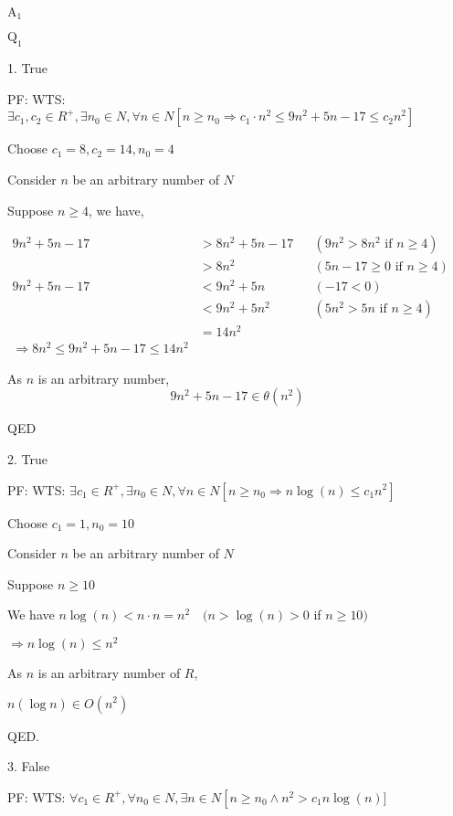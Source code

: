 \documentclass[12pt]{article}
\begin{document}
$\text{A}_{1}$

$\text{Q}_{1}$

1. True

PF: WTS: $\exists c_{1}, c_{2} \in R^{+}, \exists n_{0} \in N, \forall n \in N\left[n \geq n_{0} \Rightarrow c_{1} \cdot n^{2} \leq 9 n^{2}+5 n-17 \leq c_{2} n^{2}\right]$


Choose $c_{1}=8, c_{2}=14, n_{0}=4$

Consider $n$ be an arbitrary number of $N$

Suppose $n \geq 4$, we have,

$
\begin{array}{rlrl}
9 n^{2}+5 n-17 & >8 n^{2}+5 n-17 & & \left(9 n^{2}>8 n^{2} \text { if } n \geq 4\right) \\
&>8 n^{2} & & (5 n-17 \geq 0 \text { if } n \geq 4) \\
9 n^{2}+5 n-17 & <9 n^{2}+5 n & & (-17<0) \\
& <9 n^{2}+5 n^{2} & & \left(5 n^{2}>5 n \text { if } n \geq 4\right) \\
& =14 n^{2} & & \\
\Rightarrow 8 n^{2} \leq 9 n^{2}+5 n-17 \leq 14 n^{2} & &
\end{array}
$

As $n$ is an arbitrary number,
\begin{equation*}
9 n^{2}+5 n-17 \in \theta\left(n^{2}\right)
\end{equation*}

QED

2. True

PF: WTS: $\exists c_1 \in R^{+}, \exists n_{0}\in N, \forall n \in N\left[n \geq n_{0} \Rightarrow n \log (n) \leq c_1 n^{2}\right]$

Choose $c_{1}=1, n_{0}=10$

Consider $n$ be an arbitrary number of $N$

Suppose $n \geq 10$

We have $n \log (n)<n\cdot n=n^2 \quad(n>\log (n)>0$ if $n \geq 10)$ 

$\Rightarrow n \log (n) \leq n^{2}$

As $n$ is an arbitrary number of $R$,

$n(\log n) \in O{\left(n^{2}\right)}$

QED.

3. False

PF: WTS: $\forall c_1 \in R^{+}, \forall n_{0} \in N, \exists n \in N\left[n \geq n_{0} \wedge n^{2}>c_1 n\log (n)]\right.$
\end{document}

